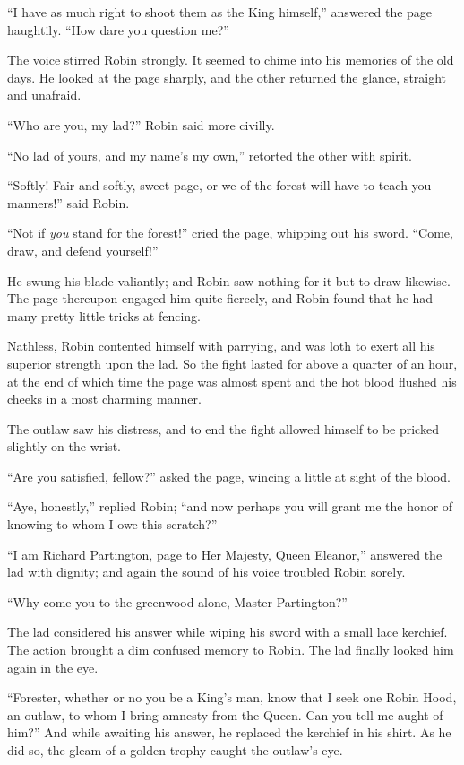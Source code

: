``I have as much right to shoot them as the King himself,'' answered the
page haughtily. ``How dare you question me?''

The voice stirred Robin strongly. It seemed to chime into his memories
of the old days. He looked at the page sharply, and the other returned
the glance, straight and unafraid.

``Who are you, my lad?'' Robin said more civilly.

``No lad of yours, and my name's my own,'' retorted the other with
spirit.

``Softly! Fair and softly, sweet page, or we of the forest will have to
teach you manners!'' said Robin.

``Not if \emph{you} stand for the forest!'' cried the page, whipping out
his sword. ``Come, draw, and defend yourself!''

He swung his blade valiantly; and Robin saw nothing for it but to draw
likewise. The page thereupon engaged him quite fiercely, and Robin found
that he had many pretty little tricks at fencing.

Nathless, Robin contented himself with parrying, and was loth to exert
all his superior strength upon the lad. So the fight lasted for above a
quarter of an hour, at the end of which time the page was almost spent
and the hot blood flushed his cheeks in a most charming manner.

The outlaw saw his distress, and to end the fight allowed himself to be
pricked slightly on the wrist.

``Are you satisfied, fellow?'' asked the page, wincing a little at sight
of the blood.

``Aye, honestly,'' replied Robin; ``and now perhaps you will grant me
the honor of knowing to whom I owe this scratch?''

``I am Richard Partington, page to Her Majesty, Queen Eleanor,''
answered the lad with dignity; and again the sound of his voice troubled
Robin sorely.

``Why come you to the greenwood alone, Master Partington?''

The lad considered his answer while wiping his sword with a small lace
kerchief. The action brought a dim confused memory to Robin. The lad
finally looked him again in the eye.

``Forester, whether or no you be a King's man, know that I seek one
Robin Hood, an outlaw, to whom I bring amnesty from the Queen. Can you
tell me aught of him?'' And while awaiting his answer, he replaced the
kerchief in his shirt. As he did so, the gleam of a golden trophy caught
the outlaw's eye.

